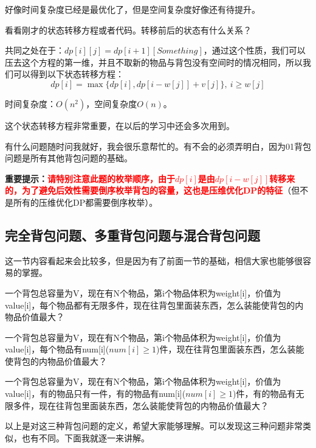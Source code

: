 好像时间复杂度已经是最优化了，但是空间复杂度好像还有待提升。

看看刚才的状态转移方程或者代码。转移前后的状态有什么关系？

共同之处在于：$dp[i][j]=dp[i+1][Something]$，通过这个性质，我们可以压去这个方程的第一维，并且不取新的物品与背包没有空间时的情况相同，所以我们可以得到以下状态转移方程：
\begin{equation*}dp[i]=\max\{dp[i],dp[i-w[j]]+v[j]\},\ i\geq w[j]\end{equation*}

时间复杂度：$O(n^2)$，空间复杂度$O(n)$。

这个状态转移方程非常重要，在以后的学习中还会多次用到。

有什么问题随时问我就好，我会很乐意帮忙的。有不会的必须弄明白，因为01背包问题是所有其他背包问题的基础。

\textbf{重要提示：}\textcolor{red}{\textbf{请特别注意此题的枚举顺序，由于$dp[i]$是由$dp[i-w[j]]$转移来的，为了避免后效性需要倒序枚举背包的容量，这也是压维优化DP的特征}}（但不是所有的压维优化DP都需要倒序枚举）。

\note


\subsection{完全背包问题、多重背包问题与混合背包问题}
这一节内容看起来会比较多，但是因为有了前面一节的基础，相信大家也能够很容易的掌握。

\begin{definition}[完全背包问题]一个背包总容量为V，现在有N个物品，第i个物品体积为weight[i]，价值为value[i]，每个物品都有无限多件，现在往背包里面装东西，怎么装能使背包的内物品价值最大？\end{definition}

\begin{definition}[多重背包问题]一个背包总容量为V，现在有N个物品，第i个物品体积为weight[i]，价值为value[i]，每个物品有num[i]($num[i]\geq 1$)件，现在往背包里面装东西，怎么装能使背包的内物品价值最大？\end{definition}

\begin{definition}[混合背包问题]一个背包总容量为V，现在有N个物品，第i个物品体积为weight[i]，价值为value[i]，有的物品只有一件，有的物品有num[i]($num[i]\geq 1$)件，有的物品有无限多件，现在往背包里面装东西，怎么装能使背包的内物品价值最大？\end{definition}

以上是对这三种背包问题的定义，希望大家能够理解。可以发现这三种问题非常类似，也有不同。下面我就逐一来讲解。

